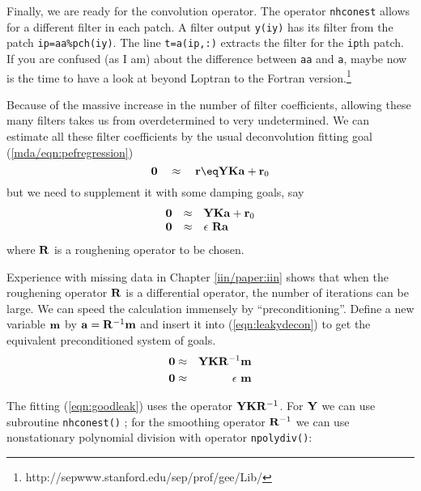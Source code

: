 \par
Finally, we are ready for the convolution operator.
The operator \texttt{nhconest} 
allows for a different filter in each patch.
A filter output \texttt{y(iy)}
has its filter from the patch \texttt{ip=aa\%pch(iy)}.
The line
\texttt{t=a(ip,:)}
extracts the filter for the \texttt{ip}th patch.
If you are confused (as I am) about the difference
between \texttt{aa} and \texttt{a},
maybe now is the time to have a look at beyond Loptran
to the Fortran version.\footnote{
	http://sepwww.stanford.edu/sep/prof/gee/Lib/
	}
\par
Because of the massive increase in the number of filter coefficients,
allowing these many filters
takes us from overdetermined to very undetermined.
We can estimate all these filter coefficients
by the usual deconvolution fitting goal (\ref{mda/eqn:pefregression})
\begin{equation}
\bold 0 \quad\approx\quad
\bold r \eq \bold Y \bold K \bold a +\bold r_0
\end{equation}
but we need to supplement it with some damping goals, say
\begin{equation}\begin{array}{lll}
\bold 0  &\approx&      \bold Y  \bold K \bold a  +\bold r_0
\\
\bold 0  &\approx&      \epsilon\ \bold R \bold a 
\label{eqn:leakydecon}
\end{array}
\end{equation}
where $\bold R$ is a roughening operator to be chosen.

\par
Experience with missing data in Chapter \ref{iin/paper:iin}
shows that when the roughening operator $\bold R$ is a differential operator,
the number of iterations can be large.
We can speed the calculation immensely by ``preconditioning''.
Define a new variable $\bold m$ by
$\bold a=\bold R^{-1}\bold m$
and insert it into (\ref{eqn:leakydecon}) to get
the equivalent preconditioned system of goals.
\begin{eqnarray}
\label{eqn:goodleak}
\bold 0   &\approx &   \bold Y  \bold K \bold R^{-1}\bold m  \\
\bold 0   &\approx &   \epsilon \ \bold m
\label{eqn:dumbdamp}
\end{eqnarray}

\par
The fitting (\ref{eqn:goodleak}) uses the operator $\bold Y\bold K\bold R^{-1}$.
For $\bold Y$ we can use subroutine
\texttt{nhconest()} ;
for the smoothing operator $\bold R^{-1}$ we can use nonstationary
polynomial division
with operator \texttt{npolydiv()}:

